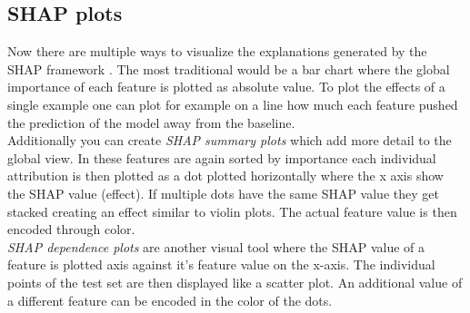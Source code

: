 \documentclass[conference]{IEEEtran}
\begin{document}
\subsection{SHAP plots}
Now there are multiple ways to visualize the explanations generated by the SHAP framework \cite{b1}.
The most traditional would be a bar chart where the global importance of each feature is plotted as absolute value. To plot the effects of a single example one can plot for example on a line how much each feature pushed the prediction of the model away from the baseline.\\
Additionally you can create \textit{SHAP summary plots} which add more detail to the global view. In these features are again sorted by importance each individual attribution is then plotted as a dot plotted horizontally where the x axis show the SHAP value (effect). If multiple dots have the same SHAP value they get stacked creating an effect similar to violin plots. The actual feature value is then encoded through color.\\
\textit{SHAP dependence plots} are another visual tool where the SHAP value of a feature is plotted axis against it's feature value on the x-axis. The individual points of the test set are then displayed like a scatter plot. An additional value of a different feature can be encoded in the color of the dots.
\end{document}
